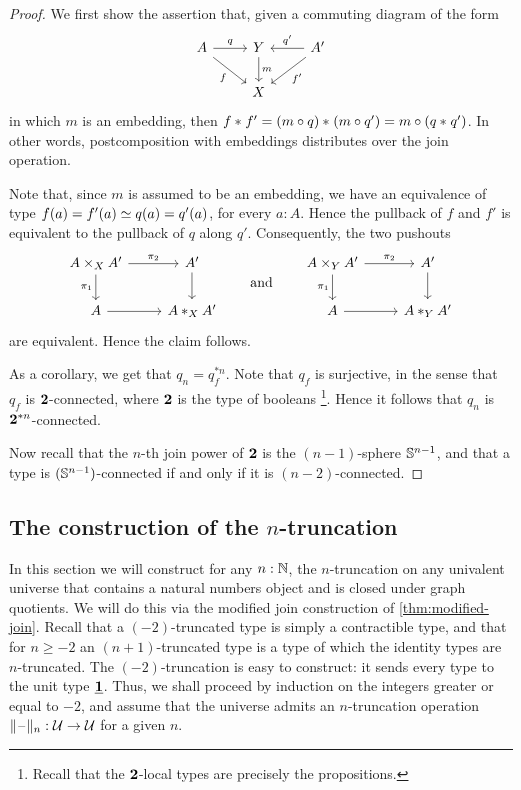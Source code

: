 \begin{proof}
We first show the assertion that, given a commuting diagram of the form
\begin{equation*}
\begin{tikzcd}
A \arrow[r,"q"] \arrow[dr,swap,"f"] & Y \arrow[d,"m"] & A' \arrow[l,swap,"{q'}"] \arrow[dl,"{f'}"] \\
& X
\end{tikzcd}
\end{equation*}
in which $m$ is an embedding, then ${f}\ast_{}{f'}={(m\circ q)}\ast_{}{(m\circ q')}=m\circ ({q}\ast_{}{q'})$.
In other words, postcomposition with embeddings distributes over 
the join operation.

Note that, since $m$ is assumed to be an embedding, we have an equivalence of
type $\eqv{f(a)=f'(a)}{q(a)=q'(a)}$, for every $a:A$. Hence the pullback of
$f$ and $f'$ is equivalent to the pullback of $q$ along $q'$. Consequently, the
two pushouts
\begin{equation*}
\begin{tikzcd}
A\times_X A' \arrow[r,"\pi_2"] \arrow[d,swap,"\pi_1"] & A' \arrow[d] \\
A \arrow[r] & \join[X]{A}{A'}
\end{tikzcd}
\qquad\text{and}\qquad
\begin{tikzcd}
A\times_Y A' \arrow[r,"\pi_2"] \arrow[d,swap,"\pi_1"] & A' \arrow[d] \\
A \arrow[r] & \join[Y]{A}{A'}
\end{tikzcd}
\end{equation*}
are equivalent. Hence the claim follows.

As a corollary, we get that $q_n=q_f^{\ast n}$. Note that $q_f$ is surjective,
in the sense that $q_f$ is $\mathbf{2}$-connected, where $\mathbf{2}$ is the type of booleans%
\footnote{Recall that the $\mathbf{2}$-local types are precisely the propositions.}.
Hence it follows that $q_n$ is $\mathbf{2}^{\ast n}$-connected. 

Now recall that the $n$-th join power of $\mathbf{2}$ is the $(n-1)$-sphere $\mathbb{S}^{n-1}$, and that
a type is $(\mathbb{S}^{n-1})$-connected if and only if it is $(n-2)$-connected.
\end{proof}

\subsection{The construction of the $n$-truncation}\label{sec:truncation}

In this section we will construct for any $n:\mathbb{N}$, the $n$-truncation on any univalent universe that contains
a natural numbers object and is closed under graph quotients.
We will do this via the modified join construction of \autoref{thm:modified-join}.
Recall that a $(-2)$-truncated type is simply a contractible type, and that
for $n\geq -2$ an $(n+1)$-truncated type is a type of which the identity types
are $n$-truncated. The $(-2)$-truncation is easy to construct: it sends
every type to the unit type $\underline{\mathbf{1}}$. Thus, we shall proceed by induction
on the integers greater or equal to $-2$, and assume that the universe admits
an $n$-truncation operation $\Vert \mathord{\hspace{1pt}\text{--}\hspace{1pt}}\Vert_{n}:\mathcal{U}\to\mathcal{U}$ for a given $n$.

